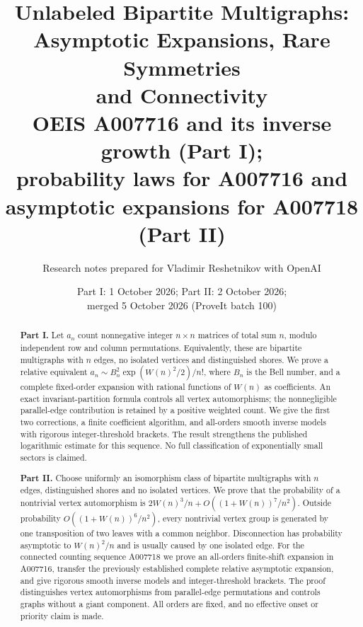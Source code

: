 \documentclass[11pt,a4paper]{article}
\title{Unlabeled Bipartite Multigraphs:\\Asymptotic Expansions, Rare Symmetries\\and Connectivity\\[3pt]\large OEIS A007716 and its inverse growth (Part I);\\ probability laws for A007716 and asymptotic expansions for A007718 (Part II)}
\author{Research notes prepared for Vladimir Reshetnikov with OpenAI}
\date{Part I: 1 October 2026; Part II: 2 October 2026;\\ merged 5 October 2026 (ProveIt batch 100)}
\theoremstyle{remark}\newtheorem{remark}[theorem]{Remark}%
\begin{document}
\maketitle
\begin{abstract}
\textbf{Part I.}
Let $a_n$ count nonnegative integer $n\times n$ matrices of total sum $n$, modulo independent row and column permutations. Equivalently, these are bipartite multigraphs with $n$ edges, no isolated vertices and distinguished shores. We prove a relative equivalent
$a_n\sim B_n^2\exp(W(n)^2/2)/n!$, where $B_n$ is the Bell number, and a complete fixed-order expansion with rational functions of $W(n)$ as coefficients. An exact invariant-partition formula controls all vertex automorphisms; the nonnegligible parallel-edge contribution is retained by a positive weighted count. We give the first two corrections, a finite coefficient algorithm, and all-orders smooth inverse models with rigorous integer-threshold brackets. The result strengthens the published logarithmic estimate for this sequence. No full classification of exponentially small sectors is claimed.

\smallskip
\textbf{Part II.}
Choose uniformly an isomorphism class of bipartite multigraphs with $n$ edges, distinguished shores and no isolated vertices. We prove that the probability of a nontrivial vertex automorphism is $2W(n)^3/n+O((1+W(n))^7/n^2)$. Outside probability $O((1+W(n))^6/n^2)$, every nontrivial vertex group is generated by one transposition of two leaves with a common neighbor. Disconnection has probability asymptotic to $W(n)^2/n$ and is usually caused by one isolated edge. For the connected counting sequence A007718 we prove an all-orders finite-shift expansion in A007716, transfer the previously established complete relative asymptotic expansion, and give rigorous smooth inverse models and integer-threshold brackets. The proof distinguishes vertex automorphisms from parallel-edge permutations and controls graphs without a giant component. All orders are fixed, and no effective onset or priority claim is made.
\end{abstract}
\end{document}
